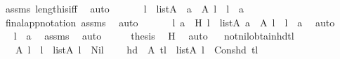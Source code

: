 \begin{isabellebody}
\ assms\ length{\isacharunderscore}{\kern0pt}is{\isacharunderscore}{\kern0pt}{}{\isacharunderscore}{\kern0pt}iff\ \isamarkupfalse%
\ auto\ \isanewline
\ \ \isamarkupfalse%
\ \isamarkupfalse%
\ {\isachardoublequoteopen}{\isasymexists}l{\isacharprime}{\kern0pt}\ {\isasymin}\ list{\isacharparenleft}{\kern0pt}A{\isacharparenright}{\kern0pt}{\isachardot}{\kern0pt}\ {\isasymexists}\ a\ {\isasymin}\ A{\isachardot}{\kern0pt}\ l\ {\isacharequal}{\kern0pt}\ l{\isacharprime}{\kern0pt}\ {\isacharat}{\kern0pt}\ {\isacharbrackleft}{\kern0pt}a{\isacharbrackright}{\kern0pt}{\isachardoublequoteclose}\ \isamarkupfalse%
\ final{\isacharunderscore}{\kern0pt}app{\isacharunderscore}{\kern0pt}notation\ assms\ \isamarkupfalse%
\ auto\ \isanewline
\ \ \isamarkupfalse%
\ \isamarkupfalse%
\ l{\isacharprime}{\kern0pt}\ a\ \ H{\isacharcolon}{\kern0pt}\ {\isachardoublequoteopen}l{\isacharprime}{\kern0pt}\ {\isasymin}\ list{\isacharparenleft}{\kern0pt}A{\isacharparenright}{\kern0pt}{\isachardoublequoteclose}\ {\isachardoublequoteopen}a\ {\isasymin}\ A{\isachardoublequoteclose}\ {\isachardoublequoteopen}l\ {\isacharequal}{\kern0pt}\ l{\isacharprime}{\kern0pt}\ {\isacharat}{\kern0pt}\ {\isacharbrackleft}{\kern0pt}a{\isacharbrackright}{\kern0pt}{\isachardoublequoteclose}\ \isamarkupfalse%
\ auto\ \isanewline
\ \ \isamarkupfalse%
\ \isamarkupfalse%
\ {\isachardoublequoteopen}l\ {\isacharequal}{\kern0pt}\ {\isacharbrackleft}{\kern0pt}a{\isacharbrackright}{\kern0pt}{\isachardoublequoteclose}\ \isamarkupfalse%
\ assms\ \isamarkupfalse%
\ auto\isanewline
\ \ \isamarkupfalse%
\ \isamarkupfalse%
\ {\isacharquery}{\kern0pt}thesis\ \isamarkupfalse%
\ H\ \isamarkupfalse%
\ auto\isanewline
{}\isamarkupfalse%
%
\endisatagproof
{\isafoldproof}%
%
\isadelimproof
\ \isanewline
%
\endisadelimproof
\isanewline
{}\isamarkupfalse%
\ not{\isacharunderscore}{\kern0pt}nil{\isacharunderscore}{\kern0pt}obtain{\isacharunderscore}{\kern0pt}hd{\isacharunderscore}{\kern0pt}tl\ {\isacharcolon}{\kern0pt}\ \isanewline
\ \ \ A\ l\ \ {\isachardoublequoteopen}l\ {\isasymin}\ list{\isacharparenleft}{\kern0pt}A{\isacharparenright}{\kern0pt}{\isachardoublequoteclose}\ {\isachardoublequoteopen}l\ {\isasymnoteq}\ Nil{\isachardoublequoteclose}\ \isanewline
\ \ \ {\isachardoublequoteopen}{\isasymexists}hd\ {\isasymin}\ A{\isachardot}{\kern0pt}\ {\isasymexists}tl\ {\isasymin}\ list{\isacharparenleft}{\kern0pt}A{\isacharparenright}{\kern0pt}{\isachardot}{\kern0pt}\ l\ {\isacharequal}{\kern0pt}\ Cons{\isacharparenleft}{\kern0pt}hd{\isacharcomma}{\kern0pt}\ tl{\isacharparenright}{\kern0pt}{\isachardoublequoteclose}\ \isanewline

\end{isabellebody}
